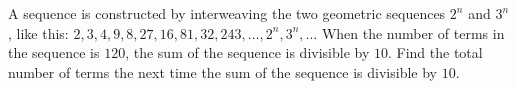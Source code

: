 A sequence is constructed by interweaving the two geometric sequences $2^n$ and $3^n$, like this: $2,3,4,9,8,27,16,81,32,243,\dots,2^n,3^n,\dots$ When the number of terms in the sequence is $120$, the sum of the sequence is divisible by $10$. Find the total number of terms the next time the sum of the sequence is divisible by $10$.

